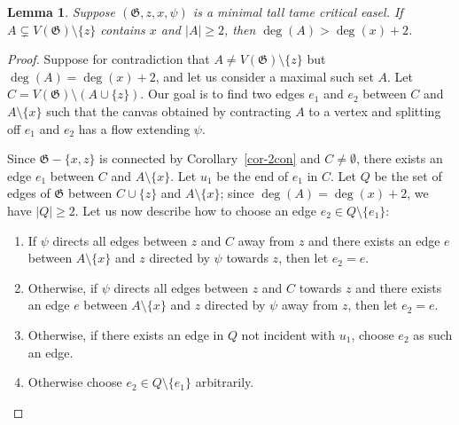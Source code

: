 \documentclass{article}
\newcommand\g{\mathfrak{G}}
\newtheorem{lemma}[theorem]{Lemma}
\begin{document}
\begin{lemma}\label{lemma-sepx}
Suppose $(\g,z,x,\psi)$ is a minimal tall tame critical easel.  If $A\subsetneq V(\g)\setminus\{z\}$ contains $x$
and $|A|\ge 2$, then $\deg(A) > \deg(x)+2$.
\end{lemma}
\begin{proof}
Suppose for contradiction that $A\neq V(\g)\setminus\{z\}$ but
$\deg(A)=\deg(x)+2$, and let us consider a maximal such set $A$.  Let
$C=V(\g)\setminus (A\cup \{z\})$. Our goal is to find two edges $e_{1}$ and
$e_{2}$ between $C$ and $A \setminus \{x\}$ such that the canvas obtained by
contracting $A$ to a vertex and splitting off $e_{1}$ and $e_{2}$ has a flow extending $\psi$.


Since $\g-\{x,z\}$ is connected by Corollary~\ref{cor-2con} and $C\neq\emptyset$, there exists an edge $e_1$ between $C$ and $A\setminus\{x\}$.
Let $u_1$ be the end of $e_1$ in $C$.  Let $Q$ be the set of edges of $\g$ between $C\cup\{z\}$ and $A\setminus\{x\}$; since $\deg(A)=\deg(x)+2$, we have $|Q|\ge 2$.
Let us now describe how to choose an edge $e_2\in Q\setminus\{e_1\}$:
\begin{enumerate}
\item If $\psi$ directs all edges between $z$ and $C$ away from $z$ and there exists an edge $e$ between $A\setminus\{x\}$ and $z$ directed by $\psi$
towards $z$, then let $e_2=e$.
\item Otherwise, if $\psi$ directs all edges between $z$ and $C$ towards $z$ and there exists an edge $e$ between $A\setminus\{x\}$ and $z$ directed by $\psi$
away from $z$, then let $e_2=e$.
\item Otherwise, if there exists an edge in $Q$ not incident with $u_1$, choose $e_2$ as such an edge.
\item Otherwise choose $e_2\in Q\setminus\{e_1\}$ arbitrarily. 
\end{enumerate}


\end{proof}
\end{document}
